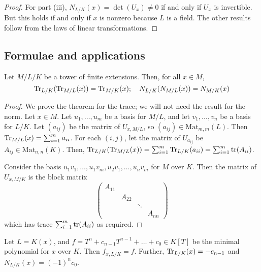 \begin{proof}
	For part (iii), \( N_{L/K}(x) = \det(U_x) \neq 0 \) if and only if \( U_x \) is invertible.
	But this holds if and only if \( x \) is nonzero because \( L \) is a field.
	The other results follow from the laws of linear transformations.
\end{proof}

\subsection{Formulae and applications}
\begin{theorem}
	Let \( M / L / K \) be a tower of finite extensions.
	Then, for all \( x \in M \),
	\[ \Tr_{L/K}(\Tr_{M/L}(x)) = \Tr_{M/K}(x);\quad N_{L/K}(N_{M/L}(x)) = N_{M/K}(x) \]
\end{theorem}
\begin{proof}
	We prove the theorem for the trace; we will not need the result for the norm.
	Let \( x \in M \).
	Let \( u_1, \dots, u_m \) be a basis for \( M / L \), and let \( v_1, \dots, v_n \) be a basis for \( L / K \).
	Let \( (a_{ij}) \) be the matrix of \( U_{x,M/L} \), so \( (a_{ij}) \in \mathrm{Mat}_{m,m}(L) \).
	Then \( \Tr_{M/L}(x) = \sum_{i=1}^m a_{ii} \).
	For each \( (i, j) \), let the matrix of \( U_{a_{ij}} \) be \( A_{ij} \in \mathrm{Mat}_{n,n}(K) \).
	Then, \( \Tr_{L/K}(\Tr_{M/L}(x)) = \sum_{i=1}^m \Tr_{L/K}(a_{ii}) = \sum_{i=1}^m \tr(A_{ii}) \).

	Consider the basis \( u_1v_1, \dots, u_1v_m, u_2v_1, \dots, u_nv_m \) for \( M \) over \( K \).
	Then the matrix of \( U_{x,M/K} \) is the block matrix
	\[ \begin{pmatrix}
		A_{11} \\
		& A_{22} \\
		& & \ddots \\
		& & & A_{nn}
	\end{pmatrix} \]
	which has trace \( \sum_{i=1}^m \tr(A_{ii}) \) as required.
\end{proof}
\begin{proposition}
	Let \( L = K(x) \), and \( f = T^n + c_{n-1} T^{n-1} + \dots + c_0 \in K[T] \) be the minimal polynomial for \( x \) over \( K \).
	Then \( f_{x,L/K} = f \).
	Further, \( \Tr_{L/K}(x) = -c_{n-1} \) and \( N_{L/K}(x) = (-1)^n c_0 \).
\end{proposition}
